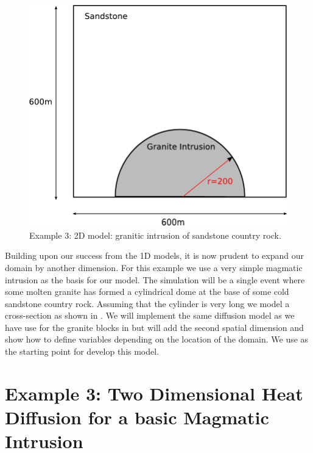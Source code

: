 
%
%
%

\begin{figure}[t]
\centerline{\includegraphics[width=4.in]{figures/twodheatdiff}}
\caption{Example 3: 2D model: granitic intrusion of sandstone country rock.}
\label{fig:twodhdmodel}
\end{figure}


Building upon our success from the 1D models, it is now prudent to expand our domain by another dimension. 
For this example we use a very simple magmatic intrusion as the basis for our model. The simulation will be a single event where some molten granite has formed a cylindrical dome at the base of some cold sandstone country rock. Assuming that the cylinder is very long 
we model a cross-section as shown in . We will implement the same 
diffusion model as we have use for the granite blocks in 
but will add the second spatial dimension and show how to define 
variables depending on the location of the domain. 
We use  as the starting point for develop this model. 

\section{Example 3: Two Dimensional Heat Diffusion for a basic Magmatic Intrusion}
\label{Sec:2DHD}

